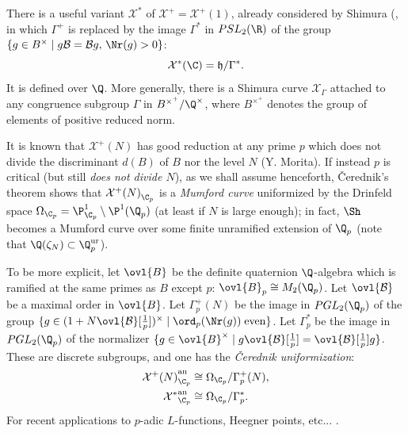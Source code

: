 \begin{para}
 There is a useful variant $\mathcal{X}^\ast$ of
 $\mathcal{X}^+={\mathcal{X}^+(1)}$, already considered by Shimura
 (\cite[3.13]{shimura67:_const}, in which 
 $\Gamma^+$ is replaced by the image $\Gamma^\ast$ in $PSL_2(\R)$ of the
 group $\{g\in B^\times \mid g\mathcal{B}=\mathcal{B}g,\,\Nr(g)>0\}$:
 \begin{equation*}
  \mathcal{X}^\ast(\C)= \mathfrak{h}/\Gamma^\ast.
 \end{equation*}
 It is defined over $\Q$. More generally, there is a
 Shimura curve $\mathcal{X}_\Gamma$ attached to any 
 congruence subgroup $\Gamma$ in $B^{\times^{+}}/\Q^\times$, where
 $B^{\times^{+}}$ denotes the group of elements of positive 
 reduced norm.
\end{para}

\begin{para}\label{para:7.4.3}
 It is known that ${\mathcal{X}^+(N)}$ has
 good reduction at any prime $p$ which does not divide the discriminant 
 $d(B)$ of $B$ nor the level $N$ (Y. Morita). If instead $p$ is critical
 (but still {\it does not divide $N$}), as we shall 
 assume henceforth, \v{C}erednik's theorem shows that
 ${\mathcal{X}^+(N)}_{\C_p}$ is a {\it Mumford curve} uniformized by 
 the Drinfeld space $\Omega_{\C_p}=\P^1_{\C_p}\setminus \P^1(\Q_p)$ (at
 least if $N$ is large enough); in fact, $\Sh$ becomes a 
 Mumford curve over some finite unramified extension of $\Q_p$ (note that
 $\Q(\zeta_N)\subset {\Q_p^{\mathrm{ur}}}$).  

 To be more explicit, let $\ovl{B}$ be the definite quaternion
 $\Q$-algebra which is ramified at the same primes as $B$ except $p$:
 $\ovl{B}_p\cong M_2(\Q_p)$. Let $\ovl{\mathcal{B}}$ be a maximal order in
 $\ovl{B}$. Let $\Gamma^+_p(N)$ be the image in $PGL_2(\Q_p)$ of the
 group $\{g\in (1+N\ovl{\mathcal{B}}[\frac{1}{p}])^\times \mid \ord_p(\Nr(g))
 \;{\rm even}\}$. Let $\Gamma^\ast_p$ be the image in $PGL_2(\Q_p)$ of
 the normalizer $\{g\in {\ovl{B}}^\times \mid g\ovl{\mathcal{B}}[\frac{1}{p}] =
 \ovl{\mathcal{B}}[\frac{1}{p}]g\}$.
 These are discrete subgroups, and one has the {\it \v{C}erednik
 uniformization}:
 \begin{align*}
  {\mathcal{X}^+(N)}_{\C_p}^{\mathrm{an}}&\cong\Omega_{\C_p}/\Gamma^+_p(N),\\
  {\mathcal{X}^{\ast}}_{\C_p}^{\mathrm{an}}&\cong\Omega_{\C_p}/\Gamma^\ast_p.
 \end{align*} 
 For recent applications to $p$-adic $L$-functions, Heegner points,
 etc... \cf \cite{bertolini98:_heegn_l_cered}.
\end{para}

